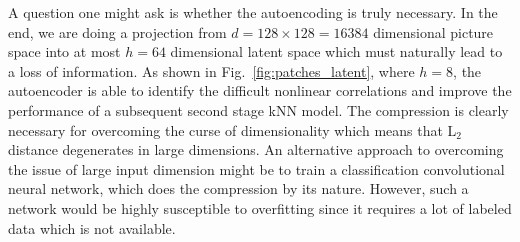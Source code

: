 A question one might ask is whether the autoencoding is truly necessary. In the end, we are doing a projection from $d=128\times128=16384$ dimensional picture space into at most $h=64$ dimensional latent space which must naturally lead to a loss of information. As shown in Fig.~\ref{fig:patches_latent}, where $h=8$, the autoencoder is able to identify the difficult nonlinear correlations and improve the performance of a subsequent second stage kNN model. The compression is clearly necessary for overcoming the curse of dimensionality which means that L$_2$ distance degenerates in large dimensions. An alternative approach to overcoming the issue of large input dimension might be to train a classification convolutional neural network, which does the compression by its nature. However, such a network would be highly susceptible to overfitting since it requires a lot of labeled data which is not available.

